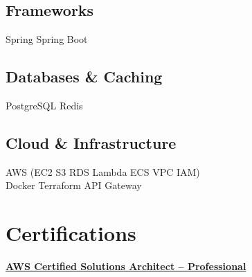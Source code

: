 \documentclass[a4paper]{deedy-resume} %
\begin{document}
\begin{minipage}[t]{0.33\textwidth}
\subsection{Frameworks}

Spring \textbullet{} Spring Boot \\

\subsection{Databases \& Caching}

PostgreSQL \textbullet{} Redis \\

\subsection{Cloud \& Infrastructure}

AWS (EC2 \textbullet{} S3 \textbullet{} RDS \textbullet{} Lambda \textbullet{} ECS \textbullet{} VPC \textbullet{} IAM) \\
Docker \textbullet{} Terraform \textbullet{} API Gateway

\sectionspace %


\section{Certifications}

\href{https://www.credly.com/badges/19942613-5ffa-4562-8e9a-404f9d93a627}{\bf AWS Certified Solutions Architect -- Professional}

\sectionspace %


\end{minipage} %
\hfill
%
%
\end{document}
